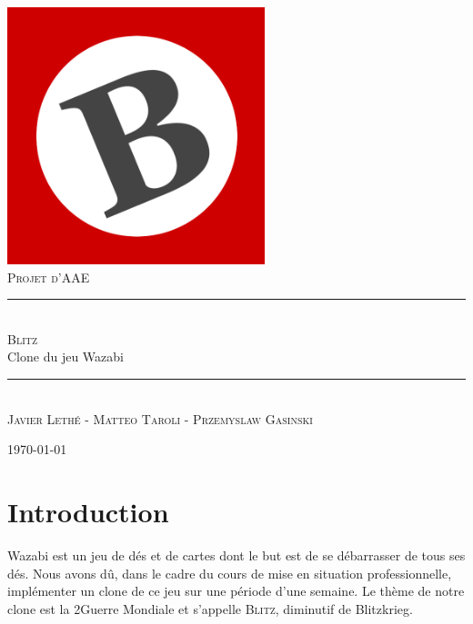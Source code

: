 \documentclass[11pt]{scrreprt}
\begin{document}
    \renewcommand{\labelitemi}{$\bullet$}
    \renewcommand{\labelitemii}{$\circ$}
    \begin{titlepage}
        \begin{center}
            ~\\[1.5cm]
            \includegraphics[width=7.5cm]{images/blitzlogo.png}
            ~\\[1.5cm]


            \textsc{\Large Projet d'AAE}\\[0.5cm]

            \rule{\textwidth}{1pt} \\[0.4cm]
            \Huge{\textsc{Blitz}}\\ \large{Clone du jeu Wazabi}\\[0.4cm]

            \rule{\textwidth}{1pt} \\[1.5cm]

            \textsc{Javier Lethé - Matteo Taroli - Przemyslaw Gasinski}

            \vfill

            {\large \today}
            \vfill
        \end{center}
    \end{titlepage}
    \tableofcontents
    \pagebreak

    \setlength{\parskip}{3mm}

    \chapter{Introduction}
    Wazabi est un jeu de dés et de cartes dont le but est de se débarrasser de tous ses dés. Nous avons dû, dans le cadre du cours de mise en situation professionnelle, implémenter un clone de ce jeu sur une période d'une semaine. Le thème de notre clone est la 2\ieme Guerre Mondiale et s'appelle \textsc{Blitz}, diminutif de \og Blitzkrieg\fg{}.
\end{document}
